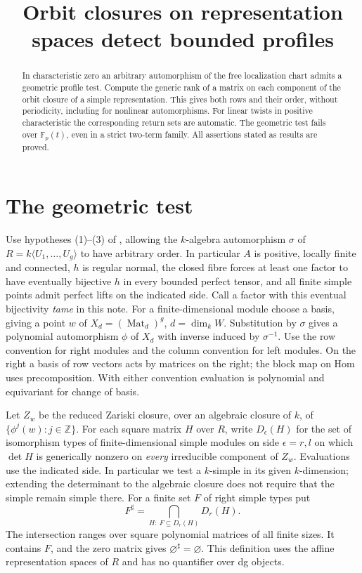 \documentclass[11pt]{article}
\title{Orbit closures on representation spaces detect bounded profiles}
\author{\workingauthor}\date{\coursedate}
\begin{document}
\maketitle
\begin{abstract}
In characteristic zero an arbitrary automorphism of the free
localization chart admits a geometric profile test. Compute the generic
rank of a matrix on each component of the orbit closure of a simple
representation. This gives both rows and their order, without periodicity,
including for nonlinear automorphisms. For linear twists in positive
characteristic the corresponding return sets are automatic. The
geometric test fails over $\mathbb F_p(t)$, even in a strict two-term
family. All assertions stated as results are proved.
\end{abstract}

\section{The geometric test}
Use hypotheses (1)--(3) of ,
allowing the $k$-algebra automorphism $\sigma$ of
$R=k\langle U_1,\ldots,U_g\rangle$ to have arbitrary order. In
particular $A$ is positive, locally finite and connected, $h$ is
regular normal, the closed fibre forces at least one factor to have
eventually bijective $h$ in every bounded perfect tensor, and all
finite simple points admit perfect lifts on the indicated side.
Call a factor with this eventual bijectivity \emph{tame} in this note.
For a finite-dimensional module choose a basis, giving a point $w$ of
$X_d=(\operatorname{Mat}_d)^g$, $d=\dim_k W$. Substitution by
$\sigma$ gives a polynomial automorphism $\phi$ of $X_d$ with inverse
induced by $\sigma^{-1}$. Use the row convention for right modules and
the column convention for left modules. On the right a basis of row
vectors acts by matrices on the right; the block map on Hom uses
precomposition. With either convention evaluation is polynomial and
equivariant for change of basis.

Let $Z_w$ be the reduced Zariski closure, over an algebraic closure
of $k$, of $\{\phi^j(w):j\in\mathbb Z\}$. For each square matrix $H$
over $R$, write $D_\epsilon(H)$ for the set of isomorphism types of
finite-dimensional simple modules on side $\epsilon=r,l$ on which
$\det H$ is generically nonzero on \emph{every} irreducible component
of $Z_w$. Evaluations use the indicated side. In particular we test a
$k$-simple in its given $k$-dimension; extending the determinant to
the algebraic closure does not require that the simple remain simple
there. For a finite set $F$ of right simple types put
\[
 F^\sharp=\bigcap_{H:\ F\subseteq D_r(H)}D_r(H).
\]
The intersection ranges over square polynomial matrices of all finite
sizes. It contains $F$, and the zero matrix gives $\varnothing^\sharp
=\varnothing$. This definition uses the affine representation spaces
of $R$ and has no quantifier over dg objects.
\end{document}
